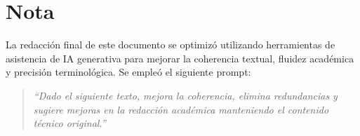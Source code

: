 \documentclass[dosguias,openany]{tesisusach}
\begin{document}
	\mainmatter
	
	
	
	
	
	
	
	
	\printbibliography[heading=bibintoc]
	

	\printglossary[title=Glosario,toctitle=Glosario]

	\appendix
	
	
	
	
	
	

	\annex

	\newpage
    \chapter*{Nota}
    La redacción final de este documento se optimizó utilizando herramientas de asistencia de IA generativa para mejorar la coherencia textual, fluidez académica y precisión terminológica. Se empleó el siguiente prompt:

    \begin{quote}
    \textit{``Dado el siguiente texto, mejora la coherencia, elimina redundancias y sugiere mejoras en la redacción académica manteniendo el contenido técnico original.''}
    \end{quote}
	
\end{document}
